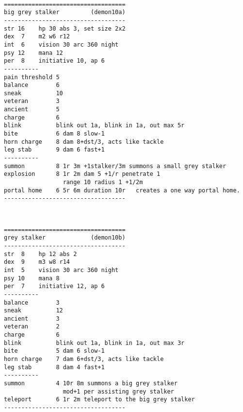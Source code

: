\

\goodbreak \begin{samepage} \small \begin{verbatim}
===================================
big grey stalker         (demon10a)
-----------------------------------
str 16    hp 30 abs 3, set size 2x2
dex  7    m2 w6 r12
int  6    vision 30 arc 360 night
psy 12    mana 12
per  8    initiative 10, ap 6
----------
pain threshold 5
balance        6
sneak          10
veteran        3
ancient        5
charge         6
blink          blink out 1a, blink in 1a, out max 5r
bite           6 dam 8 slow-1
horn charge    8 dam 8+dst/3, acts like tackle
leg stab       9 dam 6 fast+1
----------
summon         8 1r 3m +1stalker/3m summons a small grey stalker
explosion      8 1r 2m dam 5 +1/r penetrate 1
                 range 10 radius 1 +1/2m
portal home    6 5r 6m duration 10r   creates a one way portal home.
-----------------------------------
\end{verbatim} \normalsize \end{samepage}

\

\goodbreak \begin{samepage} \small \begin{verbatim}
===================================
grey stalker             (demon10b)
-----------------------------------
str  8    hp 12 abs 2
dex  9    m3 w8 r14
int  5    vision 30 arc 360 night
psy 10    mana 8
per  7    initiative 12, ap 6
----------
balance        3
sneak          12
ancient        3
veteran        2
charge         6
blink          blink out 1a, blink in 1a, out max 3r
bite           5 dam 6 slow-1
horn charge    7 dam 6+dst/3, acts like tackle
leg stab       8 dam 4 fast+1
----------
summon         4 10r 8m summons a big grey stalker
                 mod+1 per assisting grey stalker
teleport       6 1r 2m teleport to the big grey stalker
-----------------------------------
\end{verbatim} \normalsize \end{samepage}








\clearpage


